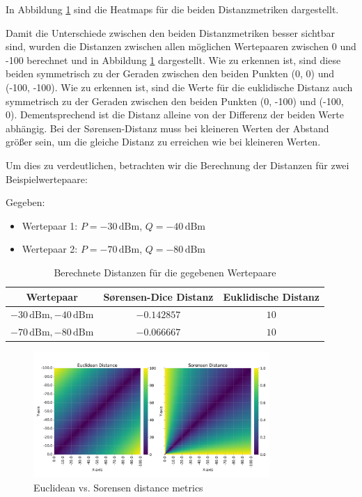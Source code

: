 In Abbildung \ref{fig:distance_metrics_heatmaps} sind die Heatmaps für die beiden Distanzmetriken dargestellt.

Damit die Unterschiede zwischen den beiden Distanzmetriken besser sichtbar sind, wurden die Distanzen zwischen allen möglichen Wertepaaren zwischen 0 und -100 berechnet und in Abbildung \ref{fig:distance_metrics_heatmaps} dargestellt. Wie zu erkennen ist, sind diese beiden symmetrisch zu der Geraden zwischen den beiden Punkten (0, 0) und (-100, -100). Wie zu erkennen ist, sind die Werte für die euklidische Distanz auch symmetrisch zu der Geraden zwischen den beiden Punkten (0, -100) und (-100, 0). Dementsprechend ist die Distanz alleine von der Differenz der beiden Werte abhängig. Bei der Sørensen-Distanz muss bei kleineren Werten der Abstand größer sein, um die gleiche Distanz zu erreichen wie bei kleineren Werten.

Um dies zu verdeutlichen, betrachten wir die Berechnung der Distanzen für zwei Beispielwertepaare:

Gegeben:
\begin{itemize}
    \item Wertepaar 1: \( P = -30 \, \text{dBm} \), \( Q = -40 \, \text{dBm} \)
    \item Wertepaar 2: \( P = -70 \, \text{dBm} \), \( Q = -80 \, \text{dBm} \)
\end{itemize}

\begin{table}[H]
    \centering
    \begin{tabular}{|c|c|c|}
        \hline
        Wertepaar                                & Sørensen-Dice Distanz & Euklidische Distanz \\
        \hline
        \(-30 \, \text{dBm}, -40 \, \text{dBm}\) & \(-0.142857\)         & \(10\)              \\
        \(-70 \, \text{dBm}, -80 \, \text{dBm}\) & \(-0.066667\)         & \(10\)              \\
        \hline
    \end{tabular}
    \caption{Berechnete Distanzen für die gegebenen Wertepaare}
    \label{tab:distance_results}
\end{table}

\begin{figure}[H]
    \centering
    \includegraphics[width=0.8\textwidth]{images/distance_metrics_heatmaps.png}
    \caption{Euclidean vs. Sorensen distance metrics}
    \label{fig:distance_metrics_heatmaps}
\end{figure}




